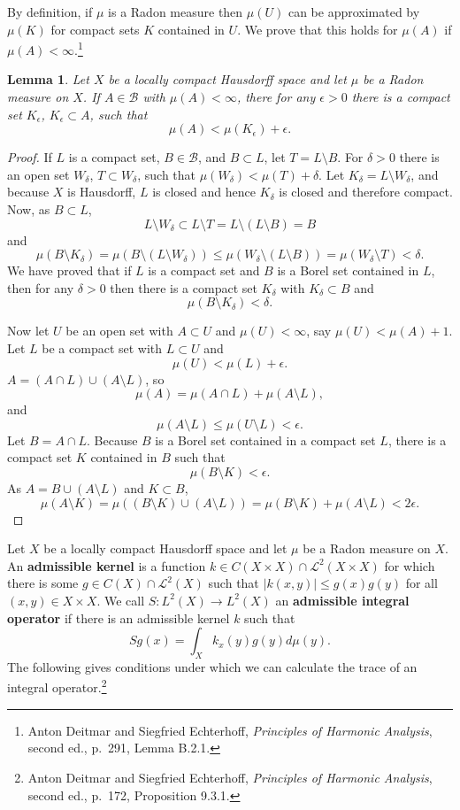 \documentclass{article}
\newtheorem{lemma}[theorem]{Lemma}
\theoremstyle{definition}
\begin{document}
By definition, if $\mu$ is a Radon measure then $\mu(U)$ can be approximated by $\mu(K)$ for compact sets $K$ contained in $U$.
We prove that this holds for $\mu(A)$ if $\mu(A)<\infty$.\footnote{Anton Deitmar and Siegfried Echterhoff,
{\em Principles of Harmonic Analysis}, second ed.,
p.~291, Lemma B.2.1.}

\begin{lemma}
Let $X$ be a locally compact Hausdorff space and let $\mu$ be a Radon measure on $X$. If
$A \in \mathscr{B}$ with $\mu(A)<\infty$, there for any $\epsilon>0$ there is a compact set $K_\epsilon$, $K_\epsilon \subset A$,
such that
\[
\mu(A) < \mu(K_\epsilon)+\epsilon.
\]
\end{lemma}
\begin{proof}
If $L$ is a compact set, $B \in \mathscr{B}$, and $B \subset L$, let $T=L \setminus B$. 
For $\delta>0$ there is an open set $W_\delta$, $T \subset W_\delta$, such that
$\mu(W_\delta)<\mu(T)+\delta$. Let $K_\delta = L \setminus W_\delta$, and because $X$ is Hausdorff, $L$ is closed
and hence $K_\delta$ is closed and therefore compact. 
Now, as $B \subset L$,
\[
L \setminus W_\delta \subset L \setminus T = L \setminus (L \setminus B) = B
\]
and
\[
\mu(B \setminus K_\delta) = \mu(B \setminus (L \setminus W_\delta))
\leq \mu(W_\delta \setminus (L \setminus B))
=\mu(W_\delta \setminus T)
<\delta.
\]
We have proved that if $L$ is a compact set and $B$ is a Borel set contained in $L$, then for any $\delta>0$
then there is a compact set $K_\delta$ with $K_\delta \subset B$ and
\[
\mu(B \setminus K_\delta) < \delta.
\]

Now let $U$ be an open set with $A \subset U$ and $\mu(U)<\infty$, say
$\mu(U)<\mu(A)+1$. Let $L$ be a compact set with $L \subset U$ and
\[
\mu(U) < \mu(L)+\epsilon.
\]
$A = (A \cap L) \cup (A \setminus L)$, so 
\[
\mu(A) = \mu(A \cap L) + \mu(A \setminus L),
\]
and
\[
\mu(A \setminus L) \leq \mu(U \setminus L) < \epsilon.
\]
Let $B = A \cap L$. Because $B$ is a Borel set contained in a compact set $L$, 
there is a compact set $K$ contained in $B$ such that 
\[
\mu(B \setminus K) < \epsilon.
\]
As $A = B \cup (A \setminus L)$ and $K \subset B$,
\[
\mu(A \setminus K) = \mu((B \setminus K) \cup (A \setminus L)) = 
\mu(B \setminus K) + \mu(A \setminus L) < 2\epsilon.
\]
\end{proof}


Let $X$ be a locally compact Hausdorff space and let
$\mu$ be a Radon measure on $X$. 
An \textbf{admissible kernel} is a function
$k \in C(X \times X) \cap \mathscr{L}^2(X \times X)$ for which
there is some $g \in C(X) \cap \mathscr{L}^2(X)$ such that
$|k(x,y)| \leq g(x) g(y)$ for all $(x,y) \in X \times X$. 
We call $S:L^2(X) \to L^2(X)$ an \textbf{admissible integral operator} if there is an admissible
kernel $k$ such that
\[
Sg(x) = \int_X k_x(y) g(y) d\mu(y).
\]
The following gives conditions under which we can calculate the trace of 
an integral operator.\footnote{Anton Deitmar and Siegfried Echterhoff,
{\em Principles of Harmonic Analysis}, second ed.,
p.~172, Proposition 9.3.1.}
\end{document}
